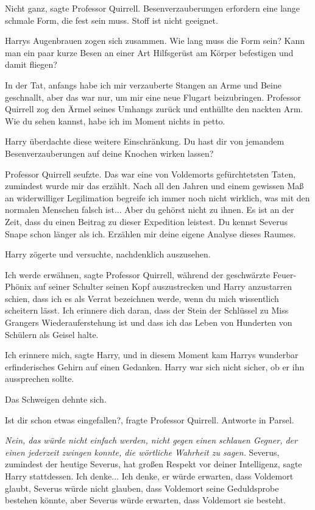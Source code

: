 \glqq{}Nicht ganz\grqq{}, sagte Professor Quirrell. \glqq{}Besenverzauberungen
erfordern eine lange schmale Form, die fest sein muss. Stoff ist nicht
geeignet.\grqq{}

Harrys Augenbrauen zogen sich zusammen. \glqq{}Wie lang muss die Form sein? Kann
man ein paar kurze Besen an einer Art Hilfsgerüst am Körper befestigen und damit
fliegen?\grqq{}

\glqq{}In der Tat, anfangs habe ich mir verzauberte Stangen an Arme und Beine
geschnallt, aber das war nur, um mir eine neue Flugart beizubringen.\grqq{} Professor
Quirrell zog den Ärmel seines Umhangs zurück und enthüllte den nackten Arm.
\glqq{}Wie du sehen kannst, habe ich im Moment nichts in petto.\grqq{}

Harry überdachte diese weitere Einschränkung. \glqq{}Du hast dir von jemandem
Besenverzauberungen auf deine Knochen wirken lassen?\grqq{}

Professor Quirrell seufzte. \glqq{}Das war eine von Voldemorts gefürchtetsten
Taten, zumindest wurde mir das erzählt. Nach all den Jahren und einem gewissen
Maß an widerwilliger Legilimation begreife ich immer noch nicht wirklich, was
mit den normalen Menschen falsch ist... Aber du gehörst nicht zu ihnen. Es ist
an der Zeit, dass du einen Beitrag zu dieser Expedition leistest. Du kennst
Severus Snape schon länger als ich. Erzählen mir deine eigene Analyse dieses
Raumes.\grqq{}

Harry zögerte und versuchte, nachdenklich auszusehen.

\glqq{}Ich werde erwähnen\grqq{}, sagte Professor Quirrell, während der
geschwärzte Feuer-Phönix auf seiner Schulter seinen Kopf auszustrecken und Harry
anzustarren schien, \glqq{}dass ich es als Verrat bezeichnen werde, wenn du mich
wissentlich scheitern lässt. Ich erinnere dich daran, dass der Stein der
Schlüssel zu Miss Grangers Wiederauferstehung ist und dass ich das Leben von
Hunderten von Schülern als Geisel halte.\grqq{}

\glqq{}Ich erinnere mich\grqq{}, sagte Harry, und in diesem Moment kam Harrys
wunderbar erfinderisches Gehirn auf einen Gedanken. Harry war sich nicht sicher,
ob er ihn aussprechen sollte.

Das Schweigen dehnte sich.

\glqq{}Ist dir schon etwas eingefallen?\grqq{}, fragte Professor Quirrell. \glqq{}
Antworte in Parsel.\grqq{}

\emph{Nein, das würde nicht einfach werden, nicht gegen einen schlauen Gegner,
der einen jederzeit zwingen konnte, die wörtliche Wahrheit zu sagen.} \glqq{}
Severus, zumindest der heutige Severus, hat großen Respekt vor deiner
Intelligenz\grqq{}, sagte Harry stattdessen. \glqq{}Ich denke... Ich denke, er
würde erwarten, dass Voldemort glaubt, Severus würde nicht glauben, dass
Voldemort seine Geduldsprobe bestehen könnte, aber Severus würde erwarten, dass
Voldemort sie besteht.\grqq{}

